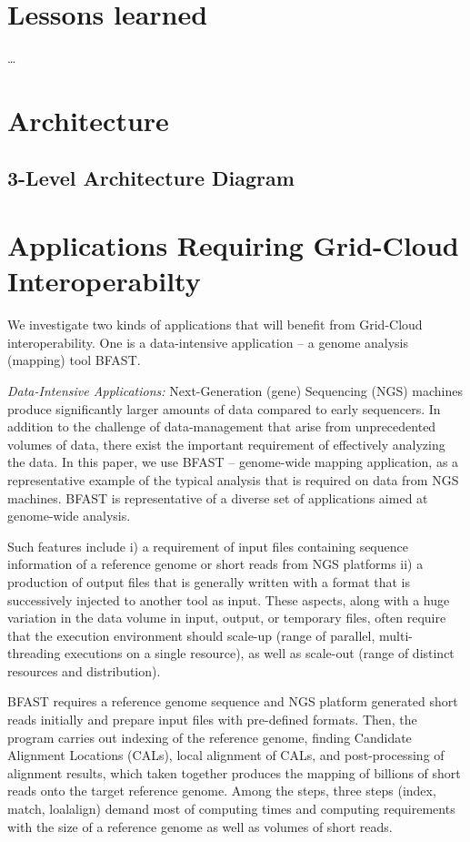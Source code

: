 \documentclass[10pt,conference,final,letterpaper,twoside,twocolumn,]{IEEEtran}
\begin{document}
\section{Lessons learned}
\label{sec:lessons}

\ldots

\section{Architecture}
\label{sec:arch}

\subsection{3-Level Architecture Diagram}

\section{Applications Requiring Grid-Cloud Interoperabilty}

We investigate two kinds of applications that will benefit
from Grid-Cloud interoperability. One is a data-intensive 
application -- a genome analysis (mapping) tool
BFAST\cite{bfast2009,bfast2009b}. 

{\it Data-Intensive Applications:} Next-Generation (gene) Sequencing
(NGS) machines produce significantly larger amounts of data compared
to early sequencers.  In addition to the challenge of data-management
that arise from unprecedented volumes of data, there exist the
important requirement of effectively analyzing the data.  In this
paper, we use BFAST -- genome-wide mapping application, as a
representative example of the typical analysis that is required on
data from NGS machines.  BFAST is representative of a diverse set of
applications aimed at genome-wide analysis.

Such features include i) a requirement of input files containing
sequence information of a reference genome or short reads from NGS
platforms ii) a production of output files that is generally written
with a format that is successively injected to another tool as input.
These aspects, along with a huge variation in the data volume in
input, output, or temporary files, often require that the execution
environment should scale-up (range of parallel, multi-threading
executions on a single resource), as well as scale-out (range of
distinct resources and distribution).

BFAST requires a reference genome sequence and NGS platform generated
short reads initially and prepare input files with pre-defined
formats.  Then, the program carries out indexing of the reference
genome, finding Candidate Alignment Locations (CALs), local alignment
of CALs, and post-processing of alignment results, which taken
together produces the mapping of billions of short reads onto the
target reference genome.  Among the steps, three steps (index, match,
loalalign) demand most of computing times and computing requirements
with the size of a reference genome as well as volumes of short reads.
\end{document}
